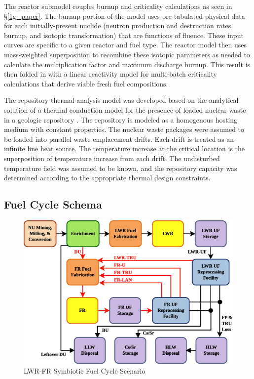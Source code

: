 The reactor submodel couples burnup and criticality calculations as seen in \S \ref{1g_paper}. The burnup portion of the
model uses pre-tabulated physical data for each initially-present nuclide (neutron production and destruction
rates, burnup, and isotopic transformation) that are functions of fluence. These input curves are specific to a
given reactor and fuel type. The reactor model then uses mass-weighted superposition to recombine these
isotopic parameters as needed to calculate the multiplication factor and maximum discharge burnup. This result is
then folded in with a linear reactivity model for multi-batch criticality calculations that derive viable
fresh fuel compositions.

The repository thermal analysis model was developed based on the
analytical solution of a thermal conduction model for the presence of
loaded nuclear waste in a geologic repository \cite{Li2010a}. The
repository is modeled as a homogenous hosting medium with constant
properties. The nuclear waste packages were assumed to be loaded into parallel
waste emplacement drifts. Each drift is treated as
an infinite line heat source. The temperature increase at the critical
location is the superposition of temperature increase from each drift. The
undisturbed temperature field was assumed to be known, and the repository
capacity was determined according to the appropriate thermal design
constraints.



\subsection{Fuel Cycle Schema}
\label{cts_sec:fcschema}

\begin{figure}[htbp]
\begin{center}
\includegraphics[scale=0.50]{ct_sensitivity/figs/LWR_FR.eps}
\caption{LWR-FR Symbiotic Fuel Cycle Scenario}
\label{lwr_fr_fc}
\end{center}
\end{figure}

